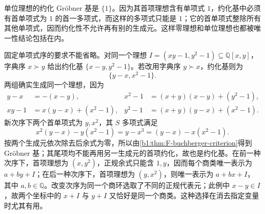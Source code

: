 单位理想的约化 Gröbner 基是 \(\{1\}\)。因为其首项理想含有单项式 \(1\)，约化基中必须有首单项式为 \(1\) 的首一多项式，而这样的多项式只能是 \(1\)；它的首单项式整除所有其他单项式，因而约化性不允许再有别的生成元。这样零理想和单位理想也都被唯一性结论包括在内。

\ProseParagraphBreak
固定单项式序的要求不能省略。对同一个理想 \(I=(xy-1,y^2-1)\subseteq\mathbb Q[x,y]\)，字典序 \(x\succ y\) 给出约化基 \(\{x-y,y^2-1\}\)。若改用字典序 \(y\succ x\)，约化基则为
\[
	\{y-x,x^2-1\}.
\]
两组确实生成同一个理想，因为
\begin{align*}
	y-x&=-(x-y),& x^2-1&=(x+y)(x-y)+(y^2-1),\\
	xy-1&=x(y-x)+(x^2-1),& y^2-1&=(x+y)(y-x)+(x^2-1).
\end{align*}
新次序下两个首单项式为 \(y,x^2\)，其 \(S\) 多项式满足
\[
	x^2(y-x)-y(x^2-1) =y-x^3=(y-x)-x(x^2-1).
\]
按两个生成元依次除去后余式为零，所以由\cref{b1:thm:F-buchberger-criterion}得到 Gröbner 基；其尾项均不能再用另一生成元的首项约化，故也是约化基。在前一种次序下，首项理想为 \((x,y^2)\)，正规余式只能含 \(1,y\)，因而每个商类唯一表示为 \(a+by+I\)；在后一种次序下，首项理想为 \((y,x^2)\)，则唯一表示为 \(a+bx+I\)，其中 \(a,b\in\mathbb Q\)。改变次序为同一个商环选取了不同的正规代表元；此例中 \(x-y\in I\)，故两个坐标中的 \(x+I\) 与 \(y+I\) 又恰好是同一个商类。这种选择在消去指定变量时尤其有用。

